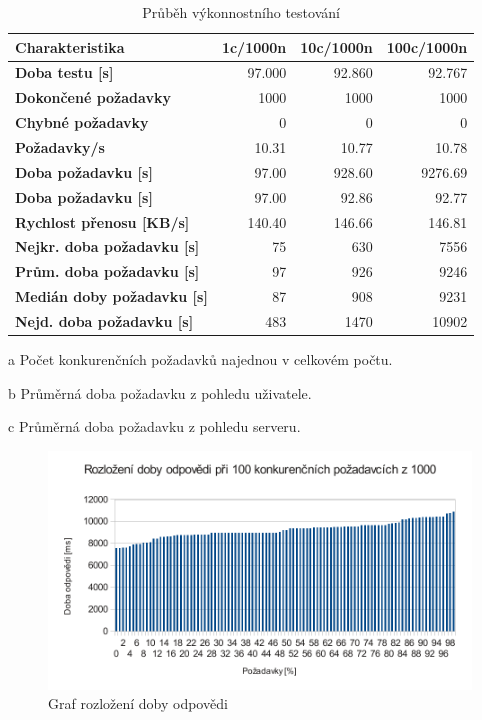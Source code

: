 \begin{table}
\begin{center}
\begin{threeparttable}
\begin{tabular}{|l|r|r|r|}
\hline
\textbf{Charak\-te\-ristika} & \textbf{1c/1000n\tnote{a}} & \textbf{10c/1000n\tnote{a}} & \textbf{100c/1000n\tnote{a}} \\
\hline
\textbf{Doba testu [s]} & {97.000} & {92.860} & {92.767} \\
\textbf{Dokončené požadavky} & {1000} & {1000} & {1000} \\
\textbf{Chybné požadavky} & {0} & {0} & {0} \\
\textbf{Požadavky/s} & {10.31} & {10.77} & {10.78} \\
\textbf{Doba požadavku\tnote{b} [s]} & {97.00} & {928.60} & {9276.69} \\
\textbf{Doba požadavku\tnote{c} [s]} & {97.00} & {92.86} & {92.77} \\
\textbf{Rychlost přenosu [KB/s]} & {140.40} & {146.66} & {146.81} \\
\hline
\textbf{Nejkr. doba požadavku [s]} & {75} & {630} & {7556} \\
\textbf{Prům. doba požadavku [s]} & {97} & {926} & {9246} \\
\textbf{Medián doby požadavku [s]} & {87} & {908} & {9231} \\
\textbf{Nejd. doba požadavku [s]} & {483} & {1470} & {10902} \\
\hline
\end{tabular}
\begin{tablenotes}
 \item[a] Počet konkurenčních požadavků najednou v celkovém počtu.
 \item[b] Průměrná doba požadavku z pohledu uživatele.
 \item[c] Průměrná doba požadavku z pohledu serveru.
\end{tablenotes}
\caption{Průběh výkonnostního testování}
\label{tab:vykonnostniTesty}
\end{threeparttable}
\end{center}
\end{table}

\begin{figure}[h]
 \centering
 \includegraphics[width=12cm]{./figures/100-1000.pdf}
 \caption{Graf rozložení doby odpovědi}
 \label{fig:vykonnostniTesty}
\end{figure}


